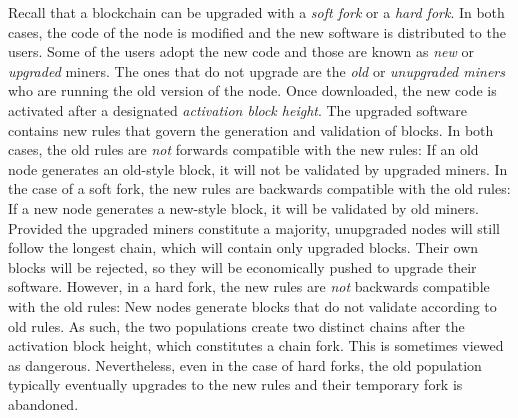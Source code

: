 Recall that a blockchain can be upgraded with a \emph{soft fork} or a \emph{hard fork}. In
both cases, the code of the node is modified and the new software is distributed to the users.
Some of the users adopt the new code and those are known as \emph{new} or \emph{upgraded} miners.
The ones that do not upgrade are the \emph{old} or \emph{unupgraded miners} who are running the
old version of the node. Once downloaded, the new code is activated after a designated
\emph{activation block height}. The upgraded software contains new rules that govern the
generation and validation of blocks. In both cases, the old rules are \emph{not} forwards compatible
with the new rules: If an old node generates an old-style block, it will not be validated by
upgraded miners. In the case of a soft fork, the new rules are backwards compatible with the
old rules: If a new node generates a new-style block, it will be validated by old miners.
Provided the upgraded miners constitute a majority, unupgraded nodes will still follow
the longest chain, which will contain only upgraded blocks. Their own blocks will be
rejected, so they will be economically pushed to upgrade their software.
However, in a hard fork, the new rules are \emph{not} backwards compatible with the
old rules: New nodes generate blocks that do not validate according to old rules.
As such, the two populations create two distinct chains after the activation block
height, which constitutes a chain fork. This is sometimes viewed as dangerous.
Nevertheless, even in the case of hard forks, the old population typically
eventually upgrades to the new rules and their temporary fork is abandoned.
